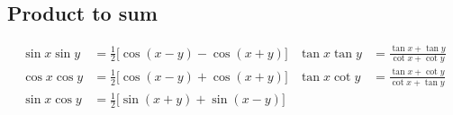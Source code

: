 \subsection*{Product to sum}

\begin{align*}
  \sin x \sin y &= \frac{1}{2}\big[\cos(x - y) - \cos(x + y)\big]
  &\tan x \tan y &= \frac{ \tan x + \tan y }{ \cot x + \cot y }\\
  \cos x \cos y &= \frac{1}{2}\big[\cos(x - y) + \cos(x + y)\big]
  &\tan x \cot y &= \frac{ \tan x + \cot y }{ \cot x + \tan y }\\
  \sin x \cos y &= \frac{1}{2}\big[\sin(x + y) + \sin(x - y)\big]\\
\end{align*}